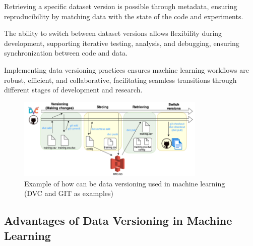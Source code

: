 Retrieving a specific dataset version is possible through 
metadata, ensuring reproducibility by matching data with 
the state of the code and experiments. 
\cite{opendatascience, yizhenzhao}

The ability to switch between dataset versions allows 
flexibility during development, supporting iterative testing, 
analysis, and debugging, ensuring synchronization between 
code and data. \cite{opendatascience, yizhenzhao}

Implementing data versioning practices ensures machine 
learning workflows are robust, efficient, and collaborative, 
facilitating seamless transitions through different stages 
of development and research. 
\cite{wandb, opendatascience, yizhenzhao}

\begin{figure}[H]
    \centering
    \includegraphics[width=0.8\textwidth]{fig/ml-dv-example.png}
    \caption{Example of how can be data versioning used in 
    machine learning (DVC and GIT as examples) \cite{opendatascience}}
    \label{fig:ml-dv-example}
\end{figure}

\subsection{Advantages of Data Versioning in Machine Learning}


